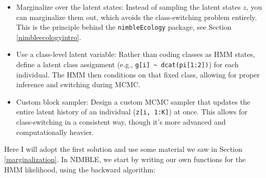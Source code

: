 \documentclass[
  12pt,
]{krantz}
\begin{document}
\begin{itemize}
\item
  Marginalize over the latent states: Instead of sampling the latent states \(z\), you can marginalize them out, which avoids the class-switching problem entirely. This is the principle behind the \texttt{nimbleEcology} package, see Section \ref{nimbleecologyintro}.
\item
  Use a class-level latent variable: Rather than coding classes as HMM states, define a latent class assignment (e.g., \texttt{g{[}i{]}\ \textasciitilde{}\ dcat(pi{[}1:2{]})}) for each individual. The HMM then conditions on that fixed class, allowing for proper inference and switching during MCMC.
\item
  Custom block sampler: Design a custom MCMC sampler that updates the entire latent history of an individual (\texttt{z{[}i,\ 1:K{]}}) at once. This allows for class-switching in a consistent way, though it's more advanced and computationally heavier.
\end{itemize}

Here I will adopt the first solution and use some material we saw in Section \ref{marginalization}. In NIMBLE, we start by writing our own functions for the HMM likelihood, using the backward algorithm:
\end{document}
